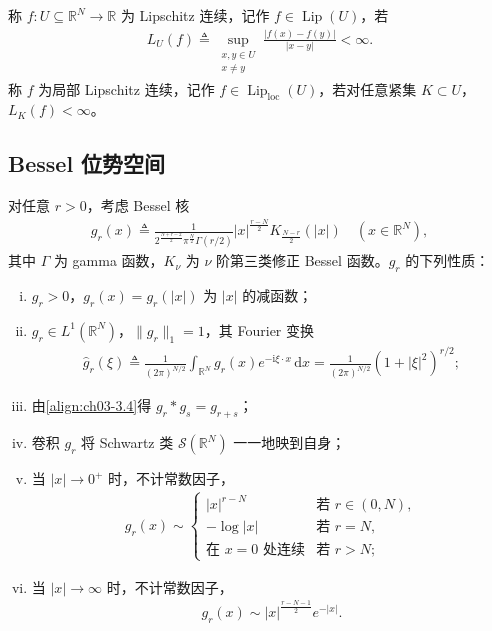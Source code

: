 \documentclass[../../main.tex]{subfiles}%
\begin{document}
\begin{definition}\label{definition:ch03-Lipschitz}
称 $f:U\subseteq\mathbb{R}^N\to\mathbb{R}$ 为 Lipschitz 连续，记作 $f\in\operatorname{Lip}(U)$，若
\begin{align*}
L_U(f)\triangleq \sup_{\substack{x,y\in U\\x\neq y}}\frac{|f(x)-f(y)|}{|x-y|}<\infty.
\end{align*}
称 $f$ 为局部 Lipschitz 连续，记作 $f\in\operatorname{Lip}_{\mathrm{loc}}(U)$，若对任意紧集 $K\subset U$，$L_K(f)<\infty$。
\end{definition}

\subsection{Bessel 位势空间}\label{subsection:ch03-Bessel位势}

对任意 $r>0$，考虑 Bessel 核
\begin{align}
g_r(x)\triangleq \frac{1}{2^{\frac{N+r-2}{2}}\pi^{\frac{N}{2}}\Gamma(r/2)}|x|^{\frac{r-N}{2}}K_{\frac{N-r}{2}}(|x|)
\quad (x\in\mathbb{R}^N),\label{align:ch03-3.3}
\end{align}
其中 $\Gamma$ 为 gamma 函数，$K_\nu$ 为 $\nu$ 阶第三类修正 Bessel 函数。$g_r$ 的下列性质：
\begin{enumerate}[(i)]
\item $g_r>0$，$g_r(x)=g_r(|x|)$ 为 $|x|$ 的减函数；
\item $g_r\in L^1(\mathbb{R}^N)$，$\|g_r\|_1=1$，其 Fourier 变换
\begin{align}
\widehat g_r(\xi)\triangleq \frac{1}{(2\pi)^{N/2}}\int_{\mathbb{R}^N}g_r(x)e^{-\mathrm{i}\xi\cdot x}\,\mathrm{d}x
=\frac{1}{(2\pi)^{N/2}}(1+|\xi|^2)^{r/2};\label{align:ch03-3.4}
\end{align}
\item 由\eqref{align:ch03-3.4}得 $g_r*g_s=g_{r+s}$；
\item 卷积 $g_r$ 将 Schwartz 类 $\mathcal{S}(\mathbb{R}^N)$ 一一地映到自身；
\item 当 $|x|\to0^+$ 时，不计常数因子，
\begin{align}
g_r(x)\sim\begin{cases}
|x|^{r-N} & \text{若 }r\in(0,N),\\
-\log|x| & \text{若 }r=N,\\
\text{在 }x=0\text{ 处连续} & \text{若 }r>N;
\end{cases}\label{align:ch03-3.5}
\end{align}
\item 当 $|x|\to\infty$ 时，不计常数因子，
\begin{align}
g_r(x)\sim|x|^{\frac{r-N-1}{2}}e^{-|x|}.\label{align:ch03-3.6}
\end{align}
\end{enumerate}
\end{document}
